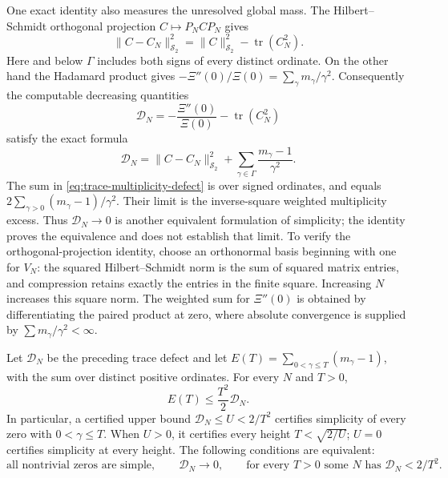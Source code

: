 One exact identity also measures the unresolved global mass. The
Hilbert--Schmidt orthogonal projection $C\mapsto P_NCP_N$ gives
\[
 \|C-C_N\|_{\mathcal S_2}^2
      =\|C\|_{\mathcal S_2}^2-\operatorname{tr}(C_N^2).
\]
Here and below $\Gamma$ includes both signs of every distinct ordinate.
On the other hand the Hadamard product gives
$-\Xi''(0)/\Xi(0)=\sum_\gamma m_\gamma/\gamma^2$.
Consequently the computable decreasing quantities
\[
 \mathcal D_N=-\frac{\Xi''(0)}{\Xi(0)}
                      -\operatorname{tr}(C_N^2)
\]
satisfy the exact formula
\begin{equation}
 \mathcal D_N=
 \|C-C_N\|_{\mathcal S_2}^2+
           \sum_{\gamma\in\Gamma}\frac{m_\gamma-1}{\gamma^2}.
 \label{eq:trace-multiplicity-defect}
\end{equation}
The sum in \eqref{eq:trace-multiplicity-defect} is over signed ordinates,
and equals $2\sum_{\gamma>0}(m_\gamma-1)/\gamma^2$.
Their limit is the inverse-square weighted multiplicity excess.
Thus $\mathcal D_N\to0$ is another equivalent formulation of simplicity;
the identity proves the equivalence and does not establish that limit.
To verify the orthogonal-projection identity, choose an orthonormal
basis beginning with one for $V_N$: the squared Hilbert--Schmidt norm
is the sum of squared matrix entries, and compression retains exactly
the entries in the finite square. Increasing $N$ increases this square
norm. The weighted sum for $\Xi''(0)$ is obtained by differentiating
the paired product at zero, where absolute convergence is supplied by
$\sum m_\gamma/\gamma^2<\infty$.

\begin{proposition}
\label{prop:trace-height}
Let $\mathcal D_N$ be the preceding trace defect and let
$E(T)=\sum_{0<\gamma\le T}(m_\gamma-1)$, with the sum over distinct
positive ordinates. For every $N$ and $T>0$,
\begin{equation}
 E(T)\le\frac{T^2}{2}\mathcal D_N.
 \label{eq:trace-height}
\end{equation}
In particular, a certified upper bound
$\mathcal D_N\le U<2/T^2$ certifies simplicity of every zero with
$0<\gamma\le T$. When $U>0$, it certifies every height
$T<\sqrt{2/U}$; $U=0$ certifies simplicity at every height.
The following conditions are equivalent:
\[
 \text{all nontrivial zeros are simple},\qquad
 \mathcal D_N\longrightarrow0,\qquad
 \text{for every }T>0\text{ some }N\text{ has }\mathcal D_N<2/T^2.
\]
\end{proposition}

